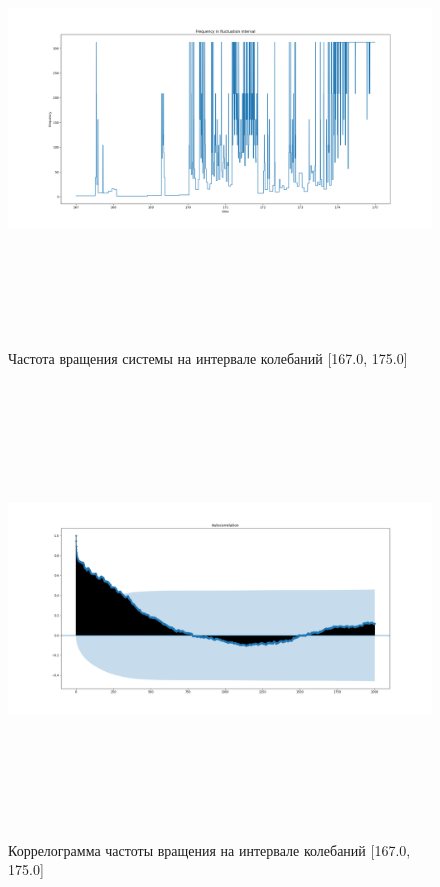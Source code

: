 \documentclass[a4paper,12pt]{article} %
\begin{document}
	\begin{figure}[H]	
		\includegraphics[width = 18cm, height = 12cm]{Fluct_filtered.png}
		\caption{Частота вращения системы на интервале колебаний [167.0, 175.0]}
		\label{fig:fluct_filtered}
	\end{figure}

	\begin{figure}[H]
		\includegraphics[width = 18cm, height = 12cm]{autocor_fluct_filtered.png}
		\caption{Коррелограмма частоты вращения  на интервале колебаний [167.0, 175.0]}
		\label{fig:autocor_fluct_filtered}
	\end{figure}
\end{document}
